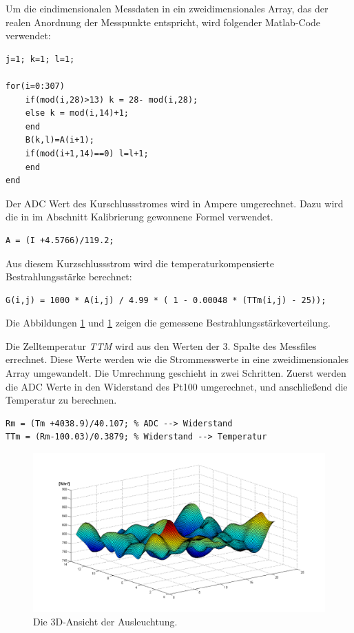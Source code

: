 \documentclass[a4paper,bibtotoc,oneside]{scrbook}
\begin{document}
\noindent Um die eindimensionalen Messdaten in ein zweidimensionales Array, das der realen Anordnung der Messpunkte entspricht, wird folgender Matlab-Code verwendet:
\begin{verbatim}
j=1; k=1; l=1;

for(i=0:307)
    if(mod(i,28)>13) k = 28- mod(i,28);
    else k = mod(i,14)+1;
    end
    B(k,l)=A(i+1);
    if(mod(i+1,14)==0) l=l+1;
    end
end
\end{verbatim}

\noindent Der ADC Wert des Kurschlussstromes wird in Ampere umgerechnet. Dazu wird die in im Abschnitt Kalibrierung gewonnene Formel verwendet.
\begin{verbatim}
A = (I +4.5766)/119.2; 
\end{verbatim}
Aus diesem Kurzschlussstrom wird die temperaturkompensierte Bestrahlungsstärke berechnet:
\begin{verbatim}
G(i,j) = 1000 * A(i,j) / 4.99 * ( 1 - 0.00048 * (TTm(i,j) - 25));
\end{verbatim}
Die Abbildungen \ref{g3d} und \ref{g3d} zeigen die gemessene Bestrahlungsstärkeverteilung.

\noindent Die Zelltemperatur \textit{TTM} wird aus den Werten der 3. Spalte des Messfiles errechnet. Diese Werte werden wie die Strommesswerte in eine zweidimensionales Array umgewandelt. Die Umrechnung geschieht in zwei Schritten. Zuerst werden die ADC Werte in den Widerstand des Pt100 umgerechnet, und anschließend die Temperatur zu berechnen.

\begin{verbatim}
Rm = (Tm +4038.9)/40.107; % ADC --> Widerstand
TTm = (Rm-100.03)/0.3879; % Widerstand --> Temperatur
\end{verbatim}



\begin{figure}[htbp]
\centering
\includegraphics[width=125mm]{img/g3d.png}
\caption{Die 3D-Ansicht der Ausleuchtung.}\label{g3d}
\end{figure}
\end{document}
